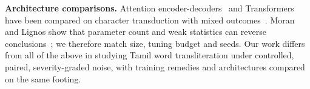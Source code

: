 \textbf{Architecture comparisons.}
Attention encoder-decoders~\cite{sutskever2014sequence,bahdanau2015neural,luong2015effective} and Transformers~\cite{vaswani2017attention} have been compared on character transduction with mixed outcomes~\cite{roark2020dakshina,kirov2024context,wu2021applying,moran2020effective}.
Moran and Lignos show that parameter count and weak statistics can reverse conclusions~\cite{moran2020effective}; we therefore match size, tuning budget and seeds.
Our work differs from all of the above in studying Tamil word transliteration under controlled, paired, severity-graded noise, with training remedies and architectures compared on the same footing.

